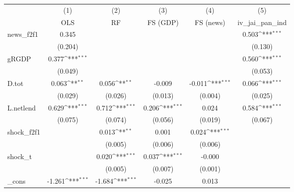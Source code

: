 {
\def\sym#1{\ifmmode^{#1}\else\(^{#1}\)\fi}
\begin{tabular}{l*{5}{c}}
\toprule
            &\multicolumn{1}{c}{(1)}&\multicolumn{1}{c}{(2)}&\multicolumn{1}{c}{(3)}&\multicolumn{1}{c}{(4)}&\multicolumn{1}{c}{(5)}\\
            &\multicolumn{1}{c}{OLS}&\multicolumn{1}{c}{RF}&\multicolumn{1}{c}{FS (GDP)}&\multicolumn{1}{c}{FS (news)}&\multicolumn{1}{c}{iv\_jai\_pan\_ind}\\
\midrule
news\_f2f1   &       0.345         &                     &                     &                     &       0.503\sym{***}\\
            &     (0.204)         &                     &                     &                     &     (0.130)         \\
\addlinespace
gRGDP       &       0.377\sym{***}&                     &                     &                     &       0.560\sym{***}\\
            &     (0.049)         &                     &                     &                     &     (0.053)         \\
\addlinespace
D.tot       &       0.063\sym{**} &       0.056\sym{**} &      -0.009         &      -0.011\sym{***}&       0.066\sym{***}\\
            &     (0.029)         &     (0.026)         &     (0.013)         &     (0.004)         &     (0.025)         \\
\addlinespace
L.netlend   &       0.629\sym{***}&       0.712\sym{***}&       0.206\sym{***}&       0.024         &       0.584\sym{***}\\
            &     (0.075)         &     (0.074)         &     (0.056)         &     (0.019)         &     (0.067)         \\
\addlinespace
shock\_f2f1  &                     &       0.013\sym{**} &       0.001         &       0.024\sym{***}&                     \\
            &                     &     (0.005)         &     (0.006)         &     (0.006)         &                     \\
\addlinespace
shock\_t     &                     &       0.020\sym{***}&       0.037\sym{***}&      -0.000         &                     \\
            &                     &     (0.005)         &     (0.007)         &     (0.001)         &                     \\
\addlinespace
\_cons      &      -1.261\sym{***}&      -1.684\sym{***}&      -0.025         &       0.013         &                     \\

\end{tabular}}
